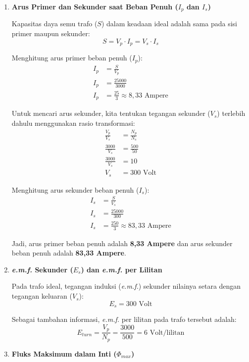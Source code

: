 \documentclass[12pt, a4paper]{article}
\begin{document}
\begin{enumerate}[label=\alph*.]
    \item \textbf{Arus Primer dan Sekunder saat Beban Penuh ($I_p$ dan $I_s$)}

    Kapasitas daya semu trafo ($S$) dalam keadaan ideal adalah sama pada sisi primer maupun sekunder:
    \[
        S = V_p \cdot I_p = V_s \cdot I_s
    \]

    Menghitung arus primer beban penuh ($I_p$):
    \begin{align*}
        I_p &= \frac{S}{V_p} \\
        I_p &= \frac{25000}{3000} \\
        I_p &= \frac{25}{3} \approx 8,33 \text{ Ampere}
    \end{align*}

    Untuk mencari arus sekunder, kita tentukan tegangan sekunder ($V_s$) terlebih dahulu menggunakan rasio transformasi:
    \begin{align*}
        \frac{V_p}{V_s} &= \frac{N_p}{N_s} \\
        \frac{3000}{V_s} &= \frac{500}{50} \\
        \frac{3000}{V_s} &= 10 \\
        V_s &= 300 \text{ Volt}
    \end{align*}

    Menghitung arus sekunder beban penuh ($I_s$):
    \begin{align*}
        I_s &= \frac{S}{V_s} \\
        I_s &= \frac{25000}{300} \\
        I_s &= \frac{250}{3} \approx 83,33 \text{ Ampere}
    \end{align*}

    Jadi, arus primer beban penuh adalah \textbf{8,33 Ampere} dan arus sekunder beban penuh adalah \textbf{83,33 Ampere}.

    \item \textbf{\textit{e.m.f.} Sekunder ($E_s$) dan \textit{e.m.f.} per Lilitan}

    Pada trafo ideal, tegangan induksi (\textit{e.m.f.}) sekunder nilainya setara dengan tegangan keluaran ($V_s$):
    \[
        E_s = 300 \text{ Volt}
    \]

    Sebagai tambahan informasi, \textit{e.m.f.} per lilitan pada trafo tersebut adalah:
    \[
        E_{turn} = \frac{V_p}{N_p} = \frac{3000}{500} = 6 \text{ Volt/lilitan}
    \]

    \item \textbf{Fluks Maksimum dalam Inti ($\Phi_{max}$)}


\end{enumerate}
\end{document}
